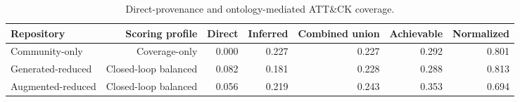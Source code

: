 \begin{table}[tb]
\centering
\caption{Direct-provenance and ontology-mediated ATT\&CK coverage.}
\label{tab:corrected_coverage_channels}
\begin{tabular}{lrrrrrr}
\toprule
Repository & Scoring profile & Direct & Inferred & Combined union & Achievable & Normalized \\
\midrule
Community-only & Coverage-only & 0.000 & 0.227 & 0.227 & 0.292 & 0.801 \\
Generated-reduced & Closed-loop balanced & 0.082 & 0.181 & 0.228 & 0.288 & 0.813 \\
Augmented-reduced & Closed-loop balanced & 0.056 & 0.219 & 0.243 & 0.353 & 0.694 \\
\bottomrule
\end{tabular}
\end{table}
